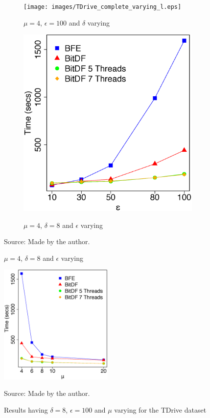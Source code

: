 {\begin{figure}[h!]
    \centering
    \caption{Results varying $\delta$ and $\epsilon$ for TDrive dataset}
    \begin{subfigure}[t]{0.49\textwidth}
        \caption{$\mu = 4$, $\epsilon = 100$ and $\delta$ varying}
        \texttt{[image: images/TDrive\_complete\_varying\_l.eps]}
        \label{fig:tdrive_complete_vary_l}
    \end{subfigure}
    \begin{subfigure}[t]{0.49\textwidth}
        \caption{$\mu = 4$, $\delta = 8$ and $\epsilon$ varying}
        \includegraphics[width=\textwidth]{images/TDrive_complete_varying_g.eps}
        \label{fig:tdrive_complete_vary_g}
    \end{subfigure}
    \footnotesize{Source: Made by the author.}
    \label{fig:tdrive_complete_results}
\end{figure}

\begin{figure}[h!]
    \centering
    \caption{Results having $\delta = 8$, $\epsilon = 100$ and $\mu$ varying for the TDrive dataset}
    \centerline{\includegraphics[width=0.5\textwidth]{images/TDrive_complete_varying_n.eps}}
    \footnotesize{Source: Made by the author.}
    \label{fig:tdrive_complete_vary_n}
\end{figure}

}
